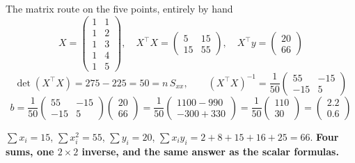 \documentclass[aspectratio=169]{beamer}
\begin{document}
\begin{frame}[shrink=6]{The matrix route on the five points, entirely by hand}
  \[
    X = \begin{pmatrix} 1&1\\1&2\\1&3\\1&4\\1&5 \end{pmatrix},\quad
    X^{\!\top}\!X = \begin{pmatrix} 5 & 15\\ 15 & 55\end{pmatrix},\quad
    X^{\!\top}y = \begin{pmatrix} 20\\ 66 \end{pmatrix}
  \]
  \[
    \det(X^{\!\top}\!X) = 275 - 225 = 50 = n\,S_{xx},
    \qquad
    (X^{\!\top}\!X)^{-1} = \frac{1}{50}
      \begin{pmatrix} 55 & -15\\ -15 & 5\end{pmatrix}
  \]
  \[
    b = \frac{1}{50}\begin{pmatrix} 55 & -15\\ -15 & 5\end{pmatrix}
        \begin{pmatrix} 20\\ 66\end{pmatrix}
      = \frac{1}{50}\begin{pmatrix} 1100 - 990\\ -300 + 330\end{pmatrix}
      = \frac{1}{50}\begin{pmatrix} 110\\ 30\end{pmatrix}
      = \begin{pmatrix} 2.2\\ 0.6\end{pmatrix}
  \]
  \begin{center}\small
    $\sum x_i = 15$, $\sum x_i^2 = 55$, $\sum y_i = 20$,
    $\sum x_iy_i = 2+8+15+16+25 = 66$. \textbf{Four sums, one $2\times2$
    inverse, and the same answer as the scalar formulas.}
  \end{center}
\end{frame}
\end{document}

